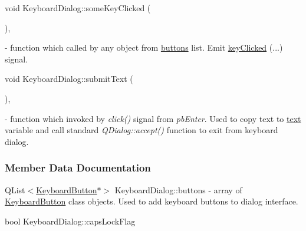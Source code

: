 \mbox{\label{classKeyboardDialog_ab13992b7c1c3025bb96826d4da17b931}} 
{\footnotesize\ttfamily void Keyboard\+Dialog\+::\texorpdfstring{some\+Key\+Clicked}{someKeyClicked} (\begin{DoxyParamCaption}{ }\end{DoxyParamCaption}){\ttfamily [private]}, {\ttfamily [slot]}} - function which called by any object from \hyperlink{classKeyboardDialog_a334172863bd0cdc1fd2792b935c3dc3e}{buttons} list. Emit \hyperlink{classKeyboardDialog_a60a486df4f0be9c78a1ac6615aea3d9e}{key\+Clicked} (...) signal.

\mbox{\label{classKeyboardDialog_ab5b4e6cdc245ddd1709a9bff9767c1c7}} 
{\footnotesize\ttfamily void Keyboard\+Dialog\+::\texorpdfstring{submit\+Text}{submitText} (\begin{DoxyParamCaption}{ }\end{DoxyParamCaption}){\ttfamily [private]}, {\ttfamily [slot]}} - function which invoked by \textit{click()} signal from \textit{pb\+Enter}. Used to copy text to \hyperlink{classKeyboardDialog_a840896bed408c1e8cdb44e27dee9d195}{text} variable and call standard \textit{Q\+Dialog::accept()} function to exit from keyboard dialog.



\subsubsection{Member Data Documentation}
\mbox{\label{classKeyboardDialog_a334172863bd0cdc1fd2792b935c3dc3e}} 
{\footnotesize\ttfamily Q\+List$<$\mbox{\hyperlink{classKeyboardButton}{Keyboard\+Button}}$\ast$$>$ Keyboard\+Dialog\+::\texorpdfstring{buttons}{buttons}{\ttfamily [private]}} - array of \hyperlink{classKeyboardButton}{Keyboard\+Button} class objects. Used to add keyboard buttons to dialog interface.

\mbox{\label{classKeyboardDialog_ac42a101f1ede0b3565cbc7d87bff20b4}} 
{\footnotesize\ttfamily bool Keyboard\+Dialog\+::\texorpdfstring{caps\+Lock\+Flag}{capsLockFlag}{\ttfamily [private]}}

